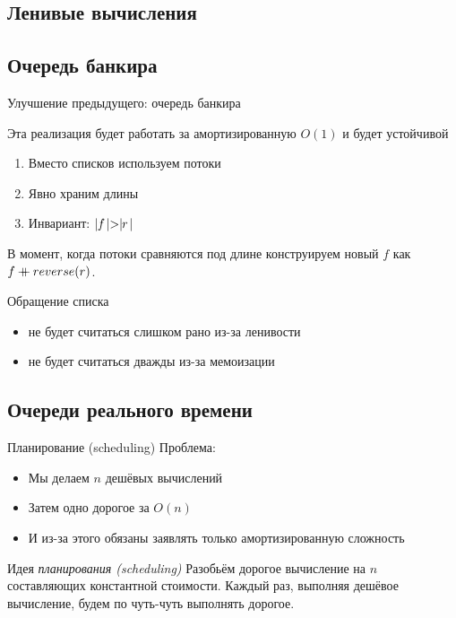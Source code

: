 \subsection{Ленивые вычисления}


\subsection{Очередь банкира}

\begin{frame}{Улучшение предыдущего: очередь банкира}
\begin{remark}
Эта реализация будет работать за амортизированную $O(1)$ и будет устойчивой
\end{remark}


\begin{enumerate}
\item Вместо списков используем потоки
\item Явно храним длины
\item Инвариант: $\mid\!\!f\!\mid>\mid\!\!r\!\mid$
\end{enumerate}
\vspace{1em}

В момент, когда потоки сравняются под длине конструируем новый $f$ как $f \mathbin{+\mkern-10mu+} reverse(r)$. \vspace{1em}

Обращение списка
\begin{itemize}
\item не будет считаться слишком рано из-за ленивости
\item не будет считаться дважды из-за мемоизации
\end{itemize}
\end{frame}


\subsection{Очереди реального времени}
\begin{frame}{Планирование (scheduling)}
Проблема:
\begin{itemize}
\item Мы делаем $n$ дешёвых вычислений
\item Затем одно дорогое за $O(n)$
\item И из-за этого обязаны заявлять только амортизированную сложность
\end{itemize}

\begin{block}{Идея \emph{планирования (scheduling)}}
Разобьём дорогое вычисление на $n$ составляющих константной стоимости. Каждый раз, выполняя дешёвое вычисление, будем по чуть-чуть выполнять дорогое.
\end{block}
\end{frame}

